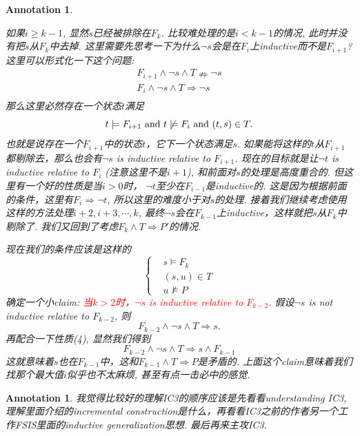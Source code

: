 \documentclass{article}
\newtheorem{annotation}[theorem]{Annotation}
\newcommand{\redt}[1]{\textcolor{red}{#1}}
\begin{document}
\begin{annotation}
\begin{itemize}
\begin{itemize}
        如果$i \geq k - 1$, 显然$s$已经被排除在$F_k$. 比较难处理的是$i < k-1$的情况, 此时并没有把$s$从$F_k$中去掉. 这里需要先思考一下为什么$\neg s$会是在$F_i$上inductive而不是$F_{i+1}$? 这里可以形式化一下这个问题:
        \[
            \begin{aligned}
            F_{i+1} \wedge \neg s \wedge T \nRightarrow \neg s \\
            F_{i} \wedge \neg s \wedge T \Rightarrow \neg s \\
            \end{aligned}
        \]
        那么这里必然存在一个状态$t$满足
        \[
            t \models F_{i+1} ~\textup{and}~ t \not\models F_{i}~\textup{and}~(t,s) \in T.
        \]
        也就是说存在一个$F_{i+1}$中的状态$t$，它下一个状态满足$s$. 如果能将这样的$t$从$F_{i+1}$都剔除去，那么也会有$\neg s$ is inductive relative to $F_{i+1}$. 现在的目标就是让$\neg t$ is inductive relative to $F_{i}$ (注意这里不是$i+1$), 和前面对$s$的处理是高度重合的. 但这里有一个好的性质是当$i > 0$时， $\neg t$至少在$F_{i-1}$是inductive的. 这是因为根据前面的条件，这里有$F_{i} \Rightarrow \neg t$, 所以这里的难度小于对$s$的处理. 接着我们继续考虑使用这样的方法处理$i+2, i+3,\cdots, k$, 最终$\neg s$会在$F_{k-1}$上inductive，这样就把$s$从$F_k$中剔除了. 我们又回到了考虑$F_k \wedge T \Rightarrow P'$的情况. 
        
        现在我们的条件应该是这样的
        \[
            \left\{
            \begin{aligned}
                &s \models F_k \\
                &(s,u) \in T \\
                &u \not\models P
            \end{aligned} \right.
        \]
        确定一个小claim: \redt{当$k > 2$时，$\neg s$ is inductive relative to $F_{k-2}$}. 假设$\neg s$ is not inductive relative to $F_{k-2}$, 则
        \[
            F_{k-2} \wedge \neg s \wedge T \Rightarrow s.
        \]
        再配合一下性质(4), 显然我们得到
        \[
            F_{k-2} \wedge \neg s \wedge T \Rightarrow s \wedge F_{k-1}
        \]
        这就意味着$s$也在$F_{k-1}$中，这和$F_{k-1} \wedge T \Rightarrow P$是矛盾的. 上面这个claim意味着我们找那个最大值$i$似乎也不太麻烦, 甚至有点一击必中的感觉. 
    \end{itemize}
\end{itemize}
\end{annotation}


\begin{annotation}
\rm 我觉得比较好的理解IC3的顺序应该是先看看understanding IC3, 理解里面介绍的incremental construction是什么，再看看IC3之前的作者另一个工作FSIS里面的inductive generalization思想. 最后再来主攻IC3.
\end{annotation}
\end{document}

